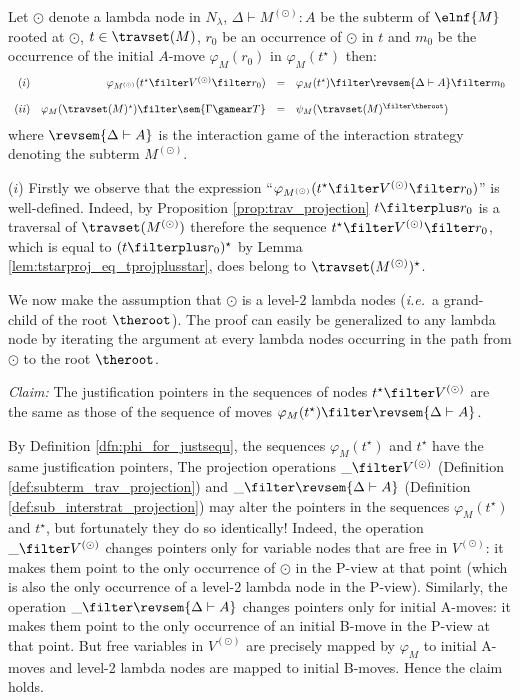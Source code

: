 \begin{lemma}
\label{lem:varphi_proj} Let $\odot$ denote a lambda node in $N_\lambda$, $\Delta \vdash
M^{(\odot)} : A$ be the subterm of $\elnf{M}$ rooted at $\odot$,
$t\in\travset(M)$, $r_0$ be an occurrence of $\odot$ in $t$ and $m_0$ be the occurrence of the initial $A$-move $\varphi_M(r_0)$ in
$\varphi_M(t^\star)$ then:
$$\begin{array}{rrcl}
(i)& \varphi_{M^{(\odot)}}(t^\star \filter V^{(\odot)} \filter r_0) &=& \varphi_M(t^\star) \filter \revsem{\Delta \vdash A} \filter m_0 \\ \\
(ii) & \varphi_M(\travset(M)^\star) \filter \sem{\Gamma \gamear T} &=& \psi_M(\travset(M)^{\filter \theroot})
\end{array}
$$
where $\revsem{\Delta \vdash A }$ is the interaction game of the interaction strategy denoting the subterm $M^{(\odot)}$.
\end{lemma}
\proof ($i$) Firstly we observe that the expression ``$\varphi_{M^{(\odot)}}(t^\star \filter V^{(\odot)} \filter r_0)$'' is well-defined. Indeed, by Proposition \ref{prop:trav_projection} $t\filterplus r_0$ is a traversal of $\travset(M^{(\odot)})$ therefore
the sequence $t^\star \filter V^{(\odot)} \filter r_0$, which is equal to $(t\filterplus r_0)^\star$ by Lemma \ref{lem:tstarproj_eq_tprojplusstar},
does belong to $\travset(M^{(\odot)})^\star$.

We now make the assumption that $\odot$ is a level-$2$ lambda nodes ({\it i.e.}\ a grand-child of the root $\theroot$). The proof can easily
be generalized to any lambda node by iterating the argument at every lambda nodes occurring in the path from $\odot$ to the root $\theroot$.


\emph{Claim:} The justification pointers in the sequences of nodes $t^\star \filter V^{(\odot)}$ are the same as those
of the sequence of moves $\varphi_M(t^\star) \filter \revsem{\Delta \vdash A }$.

By Definition \ref{dfn:phi_for_justsequ}, the sequences $\varphi_M(t^\star)$ and $t^\star$ have the same justification pointers,
The projection operations $\_ \filter V^{(\odot)}$ (Definition \ref{def:subterm_trav_projection})
and $\_ \filter \revsem{\Delta \vdash A}$ (Definition \ref{def:sub_interstrat_projection}) may alter the
pointers in the sequences $\varphi_M(t^\star)$ and $t^\star$, but fortunately they do so identically!
Indeed, the operation $\_ \filter V^{(\odot)}$ changes pointers only for variable nodes that are free in $V^{(\odot)}$: it makes them point to
the only occurrence of $\odot$ in the P-view at that point (which is also the only occurrence of a level-2 lambda node in the P-view).
Similarly, the operation $\_ \filter \revsem{\Delta \vdash A}$ changes pointers only for initial A-moves: it makes them point to
the only occurrence of an initial B-move in  the P-view at that point.
But free variables in $V^{(\odot)}$ are precisely mapped by $\varphi_M$ to initial A-moves and level-2 lambda nodes are mapped to
initial B-moves. Hence the claim holds.

